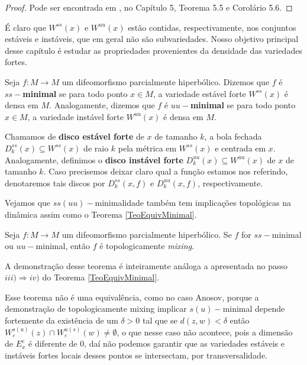\begin{proof} Pode ser encontrada em \cite{HPS}, no Capítulo 5, Teorema 5.5 e Corolário 5.6.
\end{proof}

É claro que $W^{ss}(x)$ e $W^{uu}(x)$ estão contidas, respectivamente, nos conjuntos estáveis e instáveis, que em geral não são subvariedades. Nosso objetivo principal desse capítulo é estudar as propriedades provenientes da densidade das variedades fortes.
\begin{definicao} Seja $f:M\to M$ um difeomorfismo parcialmente hiperbólico. Dizemos que $f$ é \textbf{$ss-$minimal} se para todo ponto $x\in M$, a variedade estável forte $W^{ss}(x)$ é densa em $M$. Analogamente, dizemos que $f$ é \textbf{$uu-$minimal} se para todo ponto $x\in M$, a variedade instável forte $W^{uu}(x)$ é densa em $M$. 
\end{definicao}

Chamamos de \textbf{disco estável forte} de $x$ de tamanho $k$, a bola fechada $D_k^{ss}(x)\subseteq W^{ss}(x)$ de raio $k$ pela métrica em $W^{ss}(x)$ e centrada em $x$. Analogamente, definimos o \textbf{disco instável forte} $D_k^{uu}(x)\subseteq W^{uu}(x)$ de $x$ de tamanho $k$. Caso precisemos deixar claro qual a função estamos nos referindo, denotaremos tais discos por $D^{ss}_{k}(x,f)$ e $D^{uu}_{k}(x,f)$, respectivamente.

Vejamos que $ss(uu)-$minimalidade também tem implicações topológicas na dinâmica assim como o Teorema \ref{TeoEquivMinimal}.

\begin{teorema} Seja $f:M\to M$ um difeomorfismo parcialmente hiperbólico. Se $f$ for $ss-$minimal ou $uu-$minimal, então $f$ é topologicamente \textit{mixing}.
\end{teorema}

A demonstração desse teorema é inteiramente análoga a apresentada no passo $iii)\Rightarrow iv)$ do Teorema \ref{TeoEquivMinimal}.


Esse teorema não é uma equivalência, como no caso Anosov, porque a demonstração de topologicamente mixing implicar $s(u)-$minimal depende fortemente da existência de um $\delta>0$ tal que se $d(z,w)<\delta$ então $W^{s(u)}_{\varepsilon}(z)\cap W^{u(s)}_{\varepsilon}(w)\neq \emptyset$, o que nesse caso não acontece, pois a dimensão de $E^c_x$ é diferente de 0, daí não podemos garantir que as variedades estáveis e instáveis fortes locais desses pontos se intersectam, por transversalidade.

